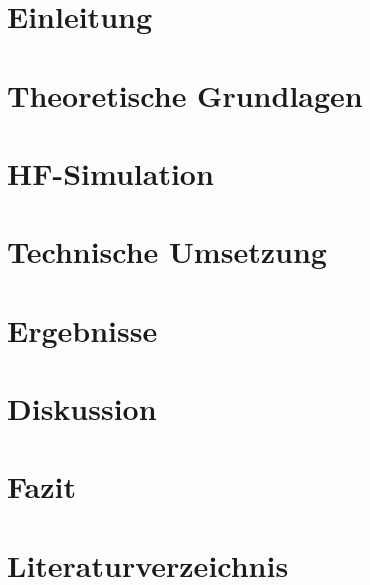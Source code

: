 \documentclass[a4paper, 11pt, oneside]{Thesis}  %
\begin{document}




\renewcommand{\contentsname}{Inhaltsverzeichnis}
\tableofcontents
\newpage

\chapter{Einleitung}


\chapter{Theoretische Grundlagen}



\chapter{HF-Simulation}


\chapter{Technische Umsetzung}


\chapter{Ergebnisse}


\chapter{Diskussion}


\chapter{Fazit}


\chapter{Literaturverzeichnis}

\end{document}
